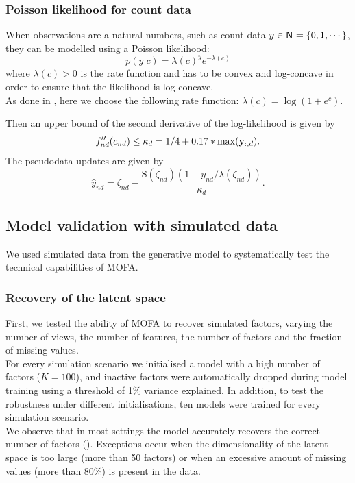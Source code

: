 \subsubsection*{Poisson likelihood for count data}
When observations are a natural numbers, such as count data $y \in \N = \{0,1,\cdots\}$, they can be modelled using a Poisson likelihood:
\begin{equation*}
p(y|c) = \lambda(c)^y e^{-\lambda(c)}
\end{equation*}
where $\lambda(c)>0$ is the rate function and has to be convex and log-concave in order to ensure that the likelihood is log-concave.\\
As done in \cite{Seeger2012}, here we choose the following rate function: $\lambda(c)=\log(1+e^c)$.

Then an upper bound of the second derivative of the log-likelihood is given by
\begin{equation*}
f''_{nd}(c_{nd}) \leq \kappa_d = 1/4 + 0.17*\max({\bf y}_{:,d}).
\end{equation*}
The pseudodata updates are given by
\begin{equation*}
\hat{y}_{nd} = \zeta_{nd} - \frac{\mathrm{S}(\zeta_{nd})(1-y_{nd}/\lambda(\zeta_{nd}))}{\kappa_d}.
\end{equation*}


\subsection{Model validation with simulated data} \label{section:mofa_simulated}
We used simulated data from the generative model to systematically test the technical capabilities of MOFA.





\subsubsection{Recovery of the latent space}
First, we tested the ability of MOFA to recover simulated factors, varying the number of views, the number of features, the number of factors and the fraction of missing values.\\ 
For every simulation scenario we initialised a model with a high number of factors ($K=100$), and inactive factors were automatically dropped during model training using a threshold of 1\% variance explained. In addition, to test the robustness under different initialisations, ten models were trained for every simulation scenario.\\
We observe that in most settings the model accurately recovers the correct number of factors (). Exceptions occur when the dimensionality of the latent space is too large (more than 50 factors) or when an excessive amount of missing values (more than 80\%) is present in the data.

